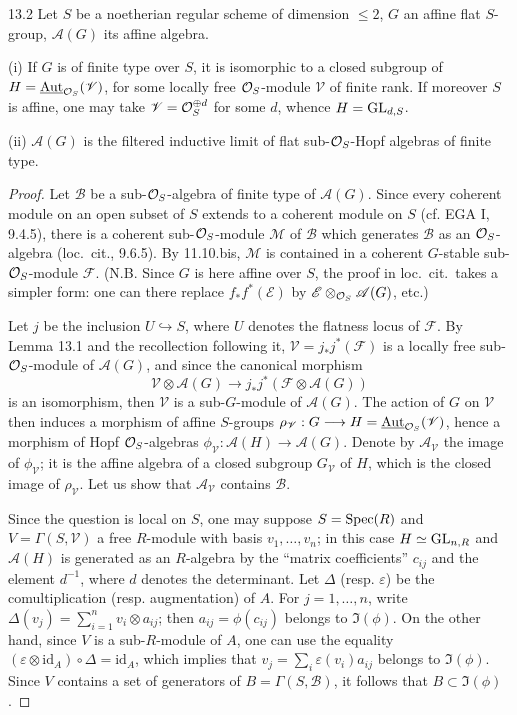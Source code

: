 \begin{proposition}{13.2}\label{VIB.13.2}
Let $S$ be a noetherian regular scheme of dimension $\leq2$, $G$ an affine flat $S$-group, $\mathscr A(G)$ its affine algebra.

(i) If $G$ is of finite type over $S$, it is isomorphic to a closed subgroup of $H=\underline{\operatorname{Aut}}_{\mathcal{O}_S}(\mathscr V)$, for some locally free $\mathcal{O}_S$-module $\mathscr V$ of finite rank. If moreover $S$ is affine, one may take $\mathscr V=\mathcal{O}_S^{\oplus d}$ for some $d$, whence $H=\operatorname{GL}_{d,S}$.

(ii) $\mathscr A(G)$ is the filtered inductive limit of flat sub-$\mathcal{O}_S$-Hopf algebras of finite type.
\end{proposition}
\begin{proof}
Let $\mathscr B$ be a sub-$\mathcal{O}_S$-algebra of finite type of $\mathscr A(G)$. Since every coherent module on an open subset of $S$ extends to a coherent module on $S$ (cf. EGA I, 9.4.5), there is a coherent sub-$\mathcal{O}_S$-module $\mathscr M$ of $\mathscr B$ which generates $\mathscr B$ as an $\mathcal{O}_S$-algebra (loc.\ cit., 9.6.5). By 11.10.bis, $\mathscr M$ is contained in a coherent $G$-stable sub-$\mathcal{O}_S$-module $\mathscr F$. (N.B. Since $G$ is here affine over $S$, the proof in loc.\ cit.\ takes a simpler form: one can there replace $f_*f^*(\mathscr E)$ by $\mathscr E\otimes_{\mathcal{O}_S}\mathscr A(G)$, etc.)

Let $j$ be the inclusion $U\hookrightarrow S$, where $U$ denotes the flatness locus of $\mathscr F$. By Lemma 13.1 and the recollection following it, $\mathscr V=j_*j^*(\mathscr F)$ is a locally free sub-$\mathcal{O}_S$-module of $\mathscr A(G)$, and since the canonical morphism
\[
\mathscr V\otimes\mathscr A(G)\to j_*j^*(\mathscr F\otimes\mathscr A(G))
\]
is an isomorphism, then $\mathscr V$ is a sub-$G$-module of $\mathscr A(G)$. The action of $G$ on $\mathscr V$ then induces a morphism of affine $S$-groups $\rho_{\mathscr V}:G\longrightarrow H=\underline{\operatorname{Aut}}_{\mathcal{O}_S}(\mathscr V)$, hence a morphism of Hopf $\mathcal{O}_S$-algebras $\phi_{\mathscr V}:\mathscr A(H)\to\mathscr A(G)$. Denote by $\mathscr A_{\mathscr V}$ the image of $\phi_{\mathscr V}$; it is the affine algebra of a closed subgroup $G_{\mathscr V}$ of $H$, which is the closed image of $\rho_{\mathscr V}$. Let us show that $\mathscr A_{\mathscr V}$ contains $\mathscr B$.

Since the question is local on $S$, one may suppose $S=\operatorname{Spec}(R)$ and $V=\Gamma(S,\mathscr V)$ a free $R$-module with basis $v_1,\ldots,v_n$; in this case $H\simeq\operatorname{GL}_{n,R}$ and $\mathscr A(H)$ is generated as an $R$-algebra by the ``matrix coefficients'' $c_{ij}$ and the element $d^{-1}$, where $d$ denotes the determinant. Let $\Delta$ (resp. $\varepsilon$) be the comultiplication (resp. augmentation) of $A$. For $j=1,\ldots,n$, write $\Delta(v_j)=\sum_{i=1}^n v_i\otimes a_{ij}$; then $a_{ij}=\phi(c_{ij})$ belongs to $\Im(\phi)$. On the other hand, since $V$ is a sub-$R$-module of $A$, one can use the equality $(\varepsilon\otimes\mathrm{id}_A)\circ\Delta=\mathrm{id}_A$, which implies that $v_j=\sum_i\varepsilon(v_i)a_{ij}$ belongs to $\Im(\phi)$. Since $V$ contains a set of generators of $B=\Gamma(S,\mathscr B)$, it follows that $B\subset\Im(\phi)$.


\end{proof}
